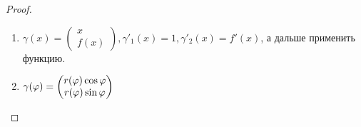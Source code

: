 \begin{proof}
    \begin{enumerate}
        \addtocounter{enumi}{1}
        \item $\gamma(x) = \begin{pmatrix} x \\ f(x) \end{pmatrix}, \gamma'_1(x) = 1, \gamma'_2(x) = f'(x)$, а дальше применить функцию.
        \item $\gamma(\varphi) = \begin{pmatrix} r(\varphi)\cos \varphi \\ r(\varphi) \sin \varphi \end{pmatrix} $
    \end{enumerate}
\end{proof}
